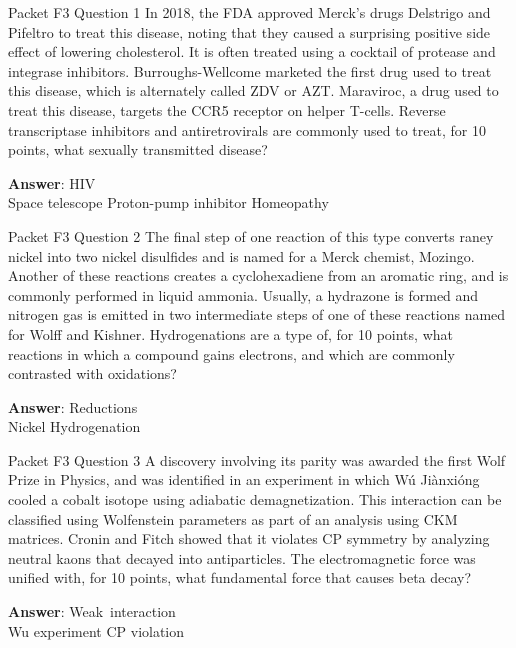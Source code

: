 \begin{frame}{Packet F3 Question 1}
In 2018, the FDA approved   Merck’s drugs Delstrigo   and Pifeltro to treat this disease, noting that they caused a surprising positive side effect of lowering cholesterol. It is often treated using a cocktail of protease and integrase inhibitors. Burroughs-Wellcome marketed the first drug used to treat this disease, which is alternately called ZDV or AZT. Maraviroc, a drug used to treat   this disease, targets the CCR5 receptor on helper T-cells.   Reverse transcriptase inhibitors and antiretrovirals are commonly used to treat, for 10 points, what sexually transmitted disease?  

\textbf{Answer}: HIV\\
 Space telescope
 Proton-pump inhibitor
 Homeopathy
\end{frame}

\begin{frame}{Packet F3 Question 2}
The final step of one reaction of this type converts raney nickel     into two nickel   disulfides and is named for a Merck chemist, Mozingo. Another   of these reactions creates a cyclohexadiene from an aromatic ring, and is commonly performed in liquid ammonia. Usually, a hydrazone is formed and nitrogen gas   is emitted in two intermediate steps of one of these reactions named for Wolff and Kishner. Hydrogenations are a type of, for 10 points, what reactions in which a compound gains electrons, and which are commonly contrasted with oxidations?

\textbf{Answer}: Reductions\\
 Nickel
 Hydrogenation
\end{frame}

\begin{frame}{Packet F3 Question 3}
A discovery involving its parity was awarded   the first Wolf Prize in Physics, and was identified in an experiment in which Wú Jiànxióng cooled a cobalt isotope using adiabatic demagnetization. This interaction can be classified   using Wolfenstein parameters as part of an analysis using CKM matrices. Cronin   and Fitch showed that it violates CP symmetry by analyzing neutral kaons that   decayed into antiparticles. The electromagnetic force was   unified with, for 10 points, what fundamental force that causes beta decay?

\textbf{Answer}: Weak\ interaction\\
 Wu experiment
 CP violation
\end{frame}

